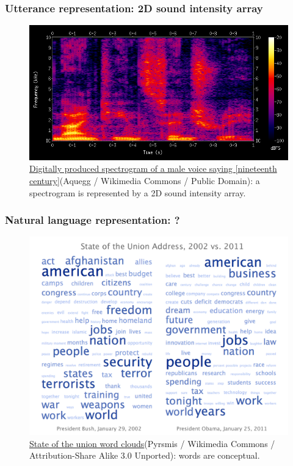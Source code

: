 \documentclass{article}
\begin{document}
\subsubsection{Utterance representation: 2D sound intensity array}
\begin{figure}[H]
	\centering
	\includegraphics[width=\linewidth]{Spectrogram-19thC}
	\caption{\href{https://commons.wikimedia.org/wiki/File:Spectrogram-19thC.png}{Digitally produced spectrogram of a male voice saying [nineteenth century]}(Aquegg / Wikimedia Commons / Public Domain): a spectrogram is represented by a 2D sound intensity array.}
	\label{fig:Spectrogram-19thC}
\end{figure}
\subsubsection{Natural language representation: ?}
\begin{figure}[H]
	\centering
	\includegraphics[width=\linewidth]{State_of_the_union_word_clouds}
	\caption{ \href{https://commons.wikimedia.org/wiki/File:State_of_the_union_word_clouds.png}{State of the union word clouds}(Pyrsmis / Wikimedia Commons / Attribution-Share Alike 3.0 Unported): words are conceptual.}
	\label{fig:State_of_the_union_word_clouds}
\end{figure}
\end{document}

